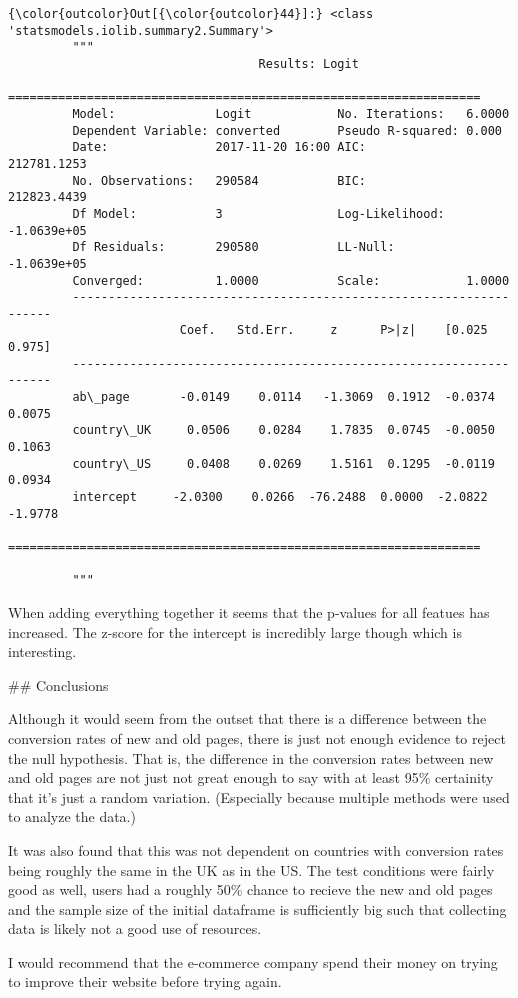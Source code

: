 \documentclass[11pt]{article}
\begin{document}
\begin{Verbatim}[commandchars=\\\{\}]
{\color{outcolor}Out[{\color{outcolor}44}]:} <class 'statsmodels.iolib.summary2.Summary'>
         """
                                   Results: Logit
         ==================================================================
         Model:              Logit            No. Iterations:   6.0000     
         Dependent Variable: converted        Pseudo R-squared: 0.000      
         Date:               2017-11-20 16:00 AIC:              212781.1253
         No. Observations:   290584           BIC:              212823.4439
         Df Model:           3                Log-Likelihood:   -1.0639e+05
         Df Residuals:       290580           LL-Null:          -1.0639e+05
         Converged:          1.0000           Scale:            1.0000     
         -------------------------------------------------------------------
                        Coef.   Std.Err.     z      P>|z|    [0.025   0.975]
         -------------------------------------------------------------------
         ab\_page       -0.0149    0.0114   -1.3069  0.1912  -0.0374   0.0075
         country\_UK     0.0506    0.0284    1.7835  0.0745  -0.0050   0.1063
         country\_US     0.0408    0.0269    1.5161  0.1295  -0.0119   0.0934
         intercept     -2.0300    0.0266  -76.2488  0.0000  -2.0822  -1.9778
         ==================================================================
         
         """
\end{Verbatim}
            
    When adding everything together it seems that the p-values for all
featues has increased. The z-score for the intercept is incredibly large
though which is interesting.

     \#\# Conclusions

    Although it would seem from the outset that there is a difference
between the conversion rates of new and old pages, there is just not
enough evidence to reject the null hypothesis. That is, the difference
in the conversion rates between new and old pages are not just not great
enough to say with at least 95\% certainity that it's just a random
variation. (Especially because multiple methods were used to analyze the
data.)

It was also found that this was not dependent on countries with
conversion rates being roughly the same in the UK as in the US. The test
conditions were fairly good as well, users had a roughly 50\% chance to
recieve the new and old pages and the sample size of the initial
dataframe is sufficiently big such that collecting data is likely not a
good use of resources.

I would recommend that the e-commerce company spend their money on
trying to improve their website before trying again.


    
    
    
    
\end{document}
